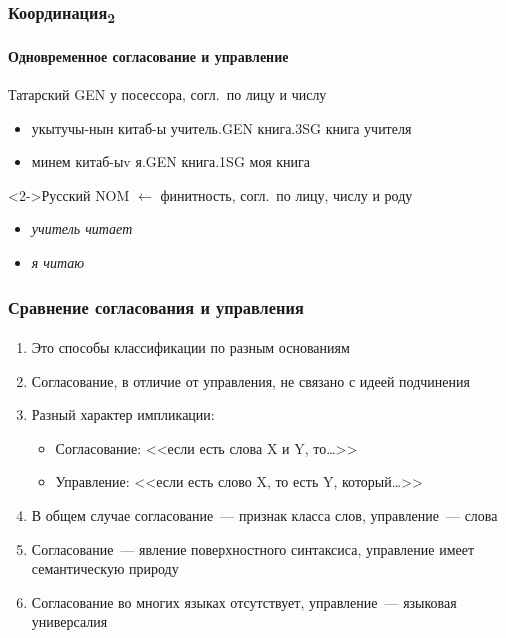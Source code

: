 \begin{frame}
  \frametitle{Координация\textsubscript{2}}
  \framesubtitle{Одновременное согласование и управление}

  \begin{exampleblock}{Татарский}
    \textsc{GEN} у посессора, согл.\ по лицу и числу
    \begin{multicols}{2}
      \begin{itemize}
        \item \digloss
          {укытучы-нын          китаб-ы}
          {учитель\textsc{.GEN} книга\textsc{.3SG}}
          {книга учителя}
        \item \digloss
          {минем          китаб-ыv}
          {я\textsc{.GEN} книга\textsc{.1SG}}
          {моя книга}
      \end{itemize}
    \end{multicols}
  \end{exampleblock}

  \begin{exampleblock}<2->{Русский}
    \textsc{NOM} $\leftarrow$ финитность, согл.\ по лицу, числу и роду \begin{itemize}
      \item \textit{учитель читает}
      \item \textit{я читаю}
    \end{itemize}
  \end{exampleblock}
\end{frame}

\begin{frame}
  \frametitle{Сравнение согласования и управления}
  \framesubtitle{\autocite{kibrik:1992}}

  \begin{enumerate}
    \item Это способы классификации по разным основаниям
    \item Согласование, в отличие от управления, не связано с идеей подчинения
    \item Разный характер импликации: \begin{itemize}
      \item Согласование: <<если есть слова X и Y, то\ldots>>
      \item Управление: <<если есть слово X, то есть Y, который\ldots>>
    \end{itemize}
    \item В общем случае согласование~--- признак класса слов, управление~--- слова
    \item Согласование~--- явление поверхностного синтаксиса, управление имеет семантическую природу
    \item Согласование во многих языках отсутствует, управление~--- языковая универсалия
  \end{enumerate}
\end{frame}


